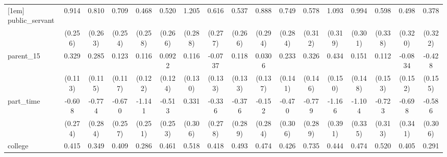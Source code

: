 {\begin{tabular}{l*{16}{c}}
[1em]
public\_servant      &       0.914\sym{***}&       0.810\sym{**} &       0.709\sym{**} &       0.468         &       0.520         &       1.205\sym{***}&       0.616\sym{*}  &       0.537\sym{*}  &       0.888\sym{**} &       0.749\sym{**} &       0.578         &       1.093\sym{***}&       0.994\sym{***}&       0.598         &       0.498         &       0.378         \\
                    &     (0.256)         &     (0.263)         &     (0.254)         &     (0.258)         &     (0.266)         &     (0.288)         &     (0.277)         &     (0.266)         &     (0.294)         &     (0.284)         &     (0.312)         &     (0.319)         &     (0.301)         &     (0.338)         &     (0.320)         &     (0.322)         \\
[1em]
parent\_15           &       0.329\sym{**} &       0.285\sym{*}  &       0.123         &       0.116         &      0.0922         &       0.116         &     -0.0737         &       0.118         &      0.0306         &       0.233         &       0.326\sym{*}  &       0.434\sym{**} &       0.151         &       0.112         &     -0.0834         &      -0.428\sym{**} \\
                    &     (0.113)         &     (0.115)         &     (0.117)         &     (0.122)         &     (0.124)         &     (0.130)         &     (0.133)         &     (0.133)         &     (0.137)         &     (0.141)         &     (0.146)         &     (0.150)         &     (0.148)         &     (0.153)         &     (0.152)         &     (0.155)         \\
[1em]
part\_time           &      -0.608\sym{*}  &      -0.774\sym{**} &      -0.670\sym{**} &      -1.141\sym{***}&      -0.513\sym{*}  &       0.331         &      -0.336         &      -0.376         &      -0.152         &      -0.470         &      -0.779\sym{**} &      -1.166\sym{**} &      -1.104\sym{***}&      -0.723\sym{*}  &      -0.698\sym{*}  &      -0.586         \\
                    &     (0.274)         &     (0.284)         &     (0.257)         &     (0.251)         &     (0.253)         &     (0.306)         &     (0.278)         &     (0.289)         &     (0.284)         &     (0.306)         &     (0.289)         &     (0.391)         &     (0.335)         &     (0.313)         &     (0.341)         &     (0.306)         \\
[1em]
college             &       0.415\sym{**} &       0.349\sym{**} &       0.409\sym{**} &       0.286\sym{*}  &       0.461\sym{**} &       0.518\sym{***}&       0.418\sym{**} &       0.493\sym{**} &       0.474\sym{**} &       0.426\sym{*}  &       0.735\sym{***}&       0.444\sym{*}  &       0.474\sym{**} &       0.520\sym{**} &       0.405\sym{*}  &       0.291         \\

\end{tabular}}
